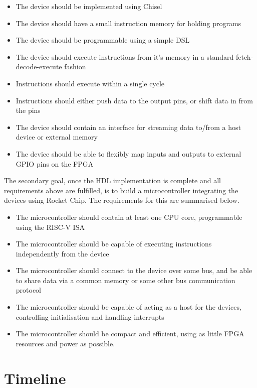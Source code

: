 \documentclass[a4paper,fleqn,12pt]{article}
\begin{document}
\begin{itemize}
    \item The device should be implemented using Chisel
    \item The device should have a small instruction memory for holding programs
    \item The device should be programmable using a simple DSL
    \item The device should execute instructions from it's memory in a standard fetch-decode-execute fashion
    \item Instructions should execute within a single cycle
    \item Instructions should either push data to the output pins, or shift data in from the pins
    \item The device should contain an interface for streaming data to/from a host device or external memory
    \item The device should be able to flexibly map inputs and outputs to external GPIO pins on the FPGA
\end{itemize}

The secondary goal, once the HDL implementation is complete and all requirements above are fulfilled, is to build a microcontroller integrating the devices using Rocket Chip. The requirements for this are summarised below.

\begin{itemize}
    \item The microcontroller should contain at least one CPU core, programmable using the RISC-V ISA
    \item The microcontroller should be capable of executing instructions independently from the device
    \item The microcontroller should connect to the device over some bus, and be able to share data via a common memory or some other bus communication protocol
    \item The microcontroller should be capable of acting as a host for the devices, controlling initialisation and handling interrupts
    \item The microcontroller should be compact and efficient, using as little FPGA resources and power as possible.
\end{itemize}

\section{Timeline}
\end{document}
